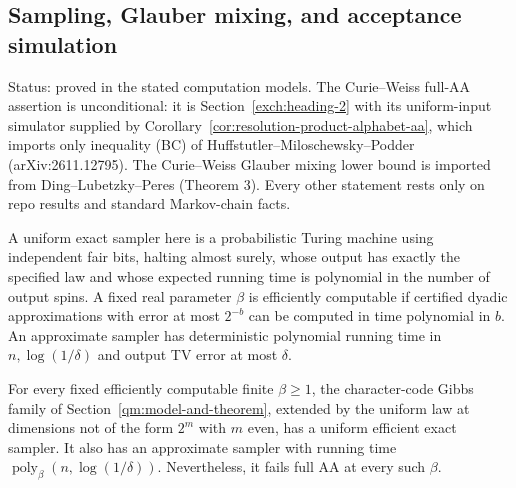 \subsection{Sampling, Glauber mixing, and acceptance simulation}
\label{ian:hard-sector-sampling}

Status: proved in the stated computation models. The Curie--Weiss full-AA assertion is unconditional: it is Section~\ref{exch:heading-2} with its uniform-input simulator supplied by Corollary~\ref{cor:resolution-product-alphabet-aa}, which imports only inequality (BC) of Huffstutler--Miloschewsky--Podder (arXiv:2611.12795). The Curie--Weiss Glauber mixing lower bound is imported from Ding--Lubetzky--Peres (Theorem 3). Every other statement rests only on repo results and standard Markov-chain facts.

A uniform exact sampler here is a probabilistic Turing machine using
independent fair bits, halting almost surely, whose output has exactly
the specified law and whose expected running time is polynomial in
the number of output spins. A fixed real parameter \(\beta\) is
efficiently computable if certified dyadic approximations with error
at most \(2^{-b}\) can be computed in time polynomial in \(b\).
An approximate sampler has deterministic polynomial running time
in \(n,\log(1/\delta)\) and output TV error at most \(\delta\).

\begin{theorem}
\label{ian:hard-sector-character-sampler}
For every fixed efficiently computable finite \(\beta\ge1\), the
character-code Gibbs family of Section~\ref{qm:model-and-theorem}, extended by the uniform law at dimensions not of the form \(2^m\) with \(m\) even, has a uniform efficient exact
sampler. It also has an approximate sampler with running time
\(\operatorname{poly}_\beta(n,\log(1/\delta))\).
Nevertheless, it fails full AA at every such \(\beta\).
\end{theorem}

